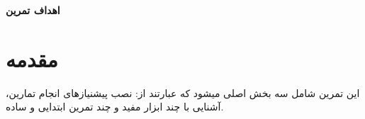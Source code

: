 \textbf{ {\Large اهداف تمرین}}

\section{مقدمه}
این تمرین شامل سه بخش اصلی میشود که عبارتند از: نصب پیشنیازهای انجام تمارین، آشنایی با چند ابزار مفید و چند تمرین ابتدایی و ساده.